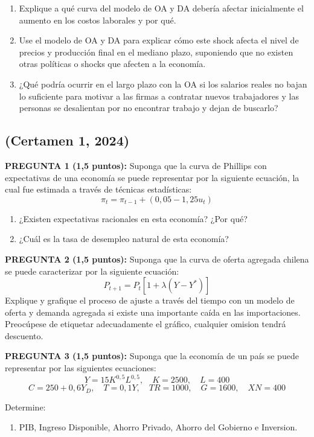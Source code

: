 \documentclass[11pt,addpoints]{article}
\begin{document}
\begin{enumerate}[label=\alph*)]
  \item Explique a qué curva del modelo de OA y DA debería afectar inicialmente el aumento en los costos laborales y por qué.
  \item Use el modelo de OA y DA para explicar cómo este shock afecta el nivel de precios y producción final en el mediano plazo, suponiendo que no existen otras políticas o shocks que afecten a la economía.
  \item ¿Qué podría ocurrir en el largo plazo con la OA si los salarios reales no bajan lo suficiente para motivar a las firmas a contratar nuevos trabajadores y las personas se desalientan por no encontrar trabajo y dejan de buscarlo?
\end{enumerate}
\newpage
\vspace*{0.05cm}
\subsection*{(Certamen 1, 2024)}
\textbf{PREGUNTA 1 (1,5 puntos):}  
Suponga que la curva de Phillips con expectativas de una economía se puede representar por la siguiente ecuación, la cual fue estimada a través de técnicas estadísticas:
\[
\pi_t = \pi_{t-1} + (0,05 - 1,25u_t)
\]
\begin{enumerate}[label=\alph*)]
    \item ¿Existen expectativas racionales en esta economía? ¿Por qué?
    \item ¿Cuál es la tasa de desempleo natural de esta economía? 
\end{enumerate}

\textbf{PREGUNTA 2 (1,5 puntos):}  
Suponga que la curva de oferta agregada chilena se puede caracterizar por la siguiente ecuación:
\[
P_{t+1} = P_t \left[ 1 + \lambda (Y - Y^*) \right]
\]
Explique y grafique el proceso de ajuste a través del tiempo con un modelo de oferta y demanda agregada si existe una importante caída en las importaciones. Preocúpese  de etiquetar adecuadamente el gráfico, cualquier omision tendrá descuento.

\vspace{0.3cm}

\textbf{PREGUNTA 3 (1,5 puntos):}  
Suponga que la economía de un país se puede representar por las siguientes ecuaciones:
\[
Y = 15K^{0,5}L^{0,5}, \quad K=2500, \quad L=400
\]
\[
C = 250 + 0,6Y_D, \quad T = 0,1Y, \quad TR=1000, \quad G=1600, \quad XN=400
\]

Determine:
\begin{enumerate}[label=\alph*)]
    \item PIB, Ingreso Disponible, Ahorro Privado, Ahorro del Gobierno e Inversion.  
\end{enumerate}
\vspace{0.3cm}
\end{document}
